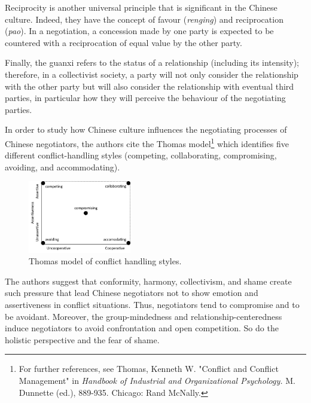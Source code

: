 \documentclass[../main.tex]{subfiles}
\begin{document}
Reciprocity is another universal principle that is significant in the Chinese culture. Indeed, they have the concept of favour (\textit{renging}) and reciprocation (\textit{pao}). In a negotiation, a concession made by one party is expected to be countered with a reciprocation of equal value by the other party.

Finally, the guanxi refers to the status of a relationship (including its intensity); therefore, in a collectivist society, a party will not only consider the relationship with the other party but will also consider the relationship with eventual third parties, in particular how they will perceive the behaviour of the negotiating parties.

In order to study how Chinese culture influences the negotiating processes of Chinese negotiators, the authors cite the Thomas model\footnote{For further references, see Thomas, Kenneth W. "Conflict and Conflict Management" in \textit{Handbook of Industrial and Organizational Psychology.} M. Dunnette (ed.), 889-935. Chicago: Rand McNally.} which identifies five different conflict-handling styles (competing, collaborating, compromising, avoiding, and accommodating).

\begin{figure}[h]
    \centering\includegraphics[width=0.40\textwidth]{images/thomas.png}
    \caption{Thomas model of conflict handling styles.}
\end{figure}

The authors suggest that conformity, harmony, collectivism, and shame create such pressure that lead Chinese negotiators not to show emotion and assertiveness in conflict situations. Thus, negotiators tend to compromise and to be avoidant. Moreover, the group-mindedness and relationship-centeredness induce negotiators to avoid confrontation and open competition. So do the holistic perspective and the fear of shame.\\
\end{document}
